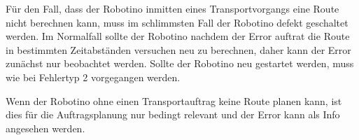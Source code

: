 Für den Fall, dass der Robotino inmitten eines Transportvorgangs eine Route nicht berechnen kann, muss im schlimmsten Fall der Robotino defekt geschaltet werden. Im Normalfall sollte der Robotino nachdem der Error auftrat die Route in bestimmten Zeitabständen versuchen neu zu berechnen, daher kann der Error zunächst nur beobachtet werden. Sollte der Robotino neu gestartet werden, muss wie bei Fehlertyp 2 vorgegangen werden. 

Wenn der Robotino ohne einen Transportauftrag keine Route planen kann, ist dies für die Auftragsplanung nur bedingt relevant und der Error kann als Info angesehen werden. 

